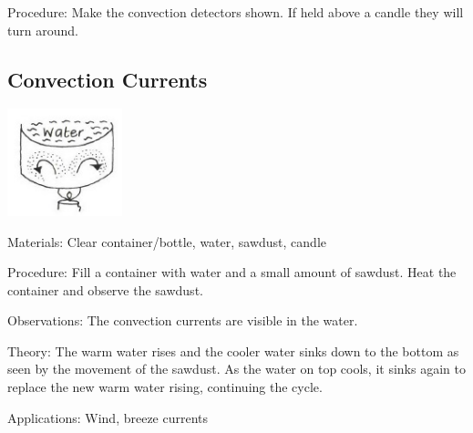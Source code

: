 \begin{multicols}{2}
\begin{description*}
\item[Procedure:]{Make the convection detectors shown. If held above a candle they will turn around.}
\end{description*}

\columnbreak

\subsection{Convection Currents}

\begin{center}
\includegraphics[width=0.25\textwidth]{./img/vso/convection-currents.jpg}
\end{center}

\begin{description*}
\item[Materials:]{Clear container/bottle, water, sawdust, candle}
\item[Procedure:]{Fill a container with water and a small amount of sawdust. Heat the container and observe the sawdust.}
\item[Observations:]{The convection currents are visible in the water.}
\item[Theory:]{The warm water rises and the cooler water sinks down to the bottom as seen by the movement of the sawdust. As the water on top cools, it sinks again to replace the new warm water rising, continuing the cycle.}
\item[Applications:]{Wind, breeze currents}
\end{description*}


\end{multicols}
